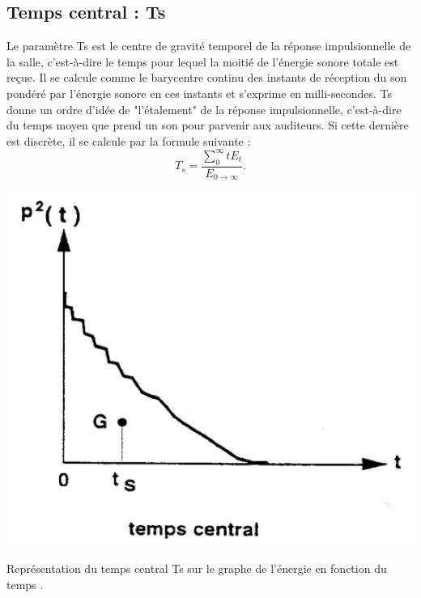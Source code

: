 \subsection{Temps central : \gls{Ts}}
Le paramètre \gls{Ts} est le centre de gravité temporel de la réponse impulsionnelle de la salle, c’est-à-dire le temps pour lequel la moitié de l’énergie sonore  totale  est  reçue. Il  se calcule  comme  le  barycentre continu  des  instants  de  réception  du  son  pondéré  par  l’énergie  sonore  en  ces  instants et s'exprime en milli-secondes. \gls{Ts} donne un ordre d’idée de "l’étalement" de la réponse impulsionnelle, c’est-à-dire du temps moyen que prend un son pour parvenir aux auditeurs. Si cette dernière est discrète, il se calcule par la formule suivante :
\begin{equation}
T_s =  \frac{\sum\limits_{0}^{\infty} tE_t}{E_{0\to\infty}}.
\end{equation}

\begin{figureth}
	\includegraphics[width=0.4\linewidth]{images/ts}
	\caption[Représentation du temps central \gls{Ts} sur le graphe de l'énergie en fonction du temps.]{Représentation du temps central \gls{Ts} sur le graphe de l'énergie en fonction du temps \footnotemark.}
	\label{ts}
\end{figureth}

